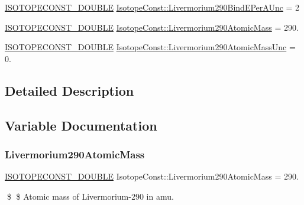 \begin{DoxyCompactItemize}
\item 
\mbox{\hyperlink{group___isotope_const-_macros_ga8f45a7272ce02c0b4c65c44636ed719a}{I\+S\+O\+T\+O\+P\+E\+C\+O\+N\+S\+T\+\_\+\+D\+O\+U\+B\+LE}} \mbox{\hyperlink{group___isotope_const-_livermorium-_lv290_gaf15477802da1abc6308e55e110369e84}{Isotope\+Const\+::\+Livermorium290\+Bind\+E\+Per\+A\+Unc}} = 2
\item 
\mbox{\hyperlink{group___isotope_const-_macros_ga8f45a7272ce02c0b4c65c44636ed719a}{I\+S\+O\+T\+O\+P\+E\+C\+O\+N\+S\+T\+\_\+\+D\+O\+U\+B\+LE}} \mbox{\hyperlink{group___isotope_const-_livermorium-_lv290_ga32ce087dafa3995cb3e8df9010f661f6}{Isotope\+Const\+::\+Livermorium290\+Atomic\+Mass}} = 290.
\item 
\mbox{\hyperlink{group___isotope_const-_macros_ga8f45a7272ce02c0b4c65c44636ed719a}{I\+S\+O\+T\+O\+P\+E\+C\+O\+N\+S\+T\+\_\+\+D\+O\+U\+B\+LE}} \mbox{\hyperlink{group___isotope_const-_livermorium-_lv290_ga8a44abd97e93a6bef813f39a25a569e5}{Isotope\+Const\+::\+Livermorium290\+Atomic\+Mass\+Unc}} = 0.
\end{DoxyCompactItemize}


\subsection{Detailed Description}


\subsection{Variable Documentation}
\mbox{\label{group___isotope_const-_livermorium-_lv290_ga32ce087dafa3995cb3e8df9010f661f6}} 
\subsubsection{\texorpdfstring{Livermorium290\+Atomic\+Mass}{Livermorium290AtomicMass}}
{\footnotesize\ttfamily \mbox{\hyperlink{group___isotope_const-_macros_ga8f45a7272ce02c0b4c65c44636ed719a}{I\+S\+O\+T\+O\+P\+E\+C\+O\+N\+S\+T\+\_\+\+D\+O\+U\+B\+LE}} Isotope\+Const\+::\+Livermorium290\+Atomic\+Mass = 290.}

\$ \$ Atomic mass of Livermorium-\/290 in amu. \mbox{\label{group___isotope_const-_livermorium-_lv290_ga8a44abd97e93a6bef813f39a25a569e5}} 
